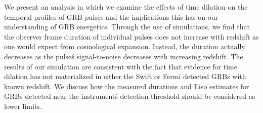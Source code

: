 


\bigskip



\bigskip

\noindent We present an analysis in which we examine the effects of time dilation on the temporal profiles of GRB pulses and the implications this has on our understanding of GRB energetics.  Through the use of simulations, we find that the observer frame duration of individual pulses does not increase with redshift as one would expect from cosmological expansion. Instead, the duration actually decreases as the pulse\'s signal-to-noise decreases with increasing redshift.  The results of our simulation are consistent with the fact that evidence for time dilation has not materialized in either the Swift or Fermi detected GRBs with known redshift.  We discuss how the measured durations and Eiso estimates for GRBs detected near the instrument\'s detection threshold should be considered as lower limits.
